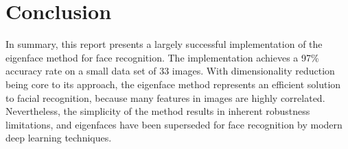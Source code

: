 \newpage
\section{Conclusion}

In summary, this report presents a largely successful implementation of the eigenface method for face recognition. The implementation achieves a 97\% accuracy rate on a small data set of 33 images. With dimensionality reduction being core to its approach, the eigenface method represents an efficient solution to facial recognition, because many features in images are highly correlated. Nevertheless, the simplicity of the method results in inherent robustness limitations, and eigenfaces have been superseded for face recognition by modern deep learning techniques.

